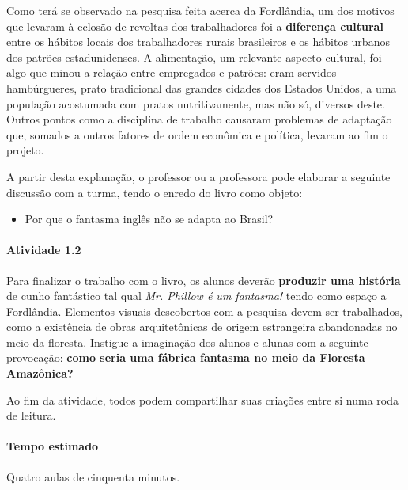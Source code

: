 \documentclass[11pt]{extarticle}
\begin{document}

Como terá se observado na pesquisa feita acerca da Fordlândia, um dos motivos
que levaram à eclosão de revoltas dos trabalhadores foi a \textbf{diferença cultural}
entre os hábitos locais dos trabalhadores rurais brasileiros e os hábitos urbanos 
dos patrões estadunidenses. A alimentação, um relevante aspecto cultural,
foi algo que minou a relação entre empregados e patrões: eram servidos hambúrgueres, 
prato tradicional das grandes cidades dos Estados Unidos, a uma população acostumada 
com pratos nutritivamente, mas não só, diversos deste. Outros pontos como a disciplina
de trabalho causaram problemas de adaptação que, somados a outros fatores de 
ordem econômica e política, levaram ao fim o projeto.


A partir desta explanação, o professor ou a professora pode elaborar a seguinte
discussão com a turma, tendo o enredo do livro como objeto:
\begin{itemize}
\item Por que o fantasma inglês não se adapta ao Brasil?
\end{itemize}

\paragraph{Atividade 1.2}

Para finalizar o trabalho com o livro, os alunos deverão \textbf{produzir uma história}
de cunho fantástico tal qual \textit{Mr. Phillow é um fantasma!} tendo como espaço
a Fordlândia. Elementos visuais descobertos com a pesquisa devem ser trabalhados, 
como a existência de obras arquitetônicas de origem estrangeira abandonadas no meio 
da floresta.
Instigue a imaginação dos alunos e alunas com a seguinte provocação: \textbf{como seria
uma fábrica fantasma no meio da Floresta Amazônica?}

Ao fim da atividade, todos podem compartilhar suas criações entre si
numa roda de leitura. 

\paragraph{Tempo estimado} Quatro aulas de cinquenta minutos.
\end{document}
